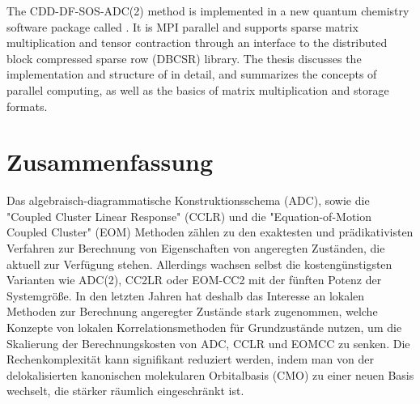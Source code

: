 The CDD-DF-SOS-ADC(2) method is implemented in a new quantum chemistry software package called \mchem{}. It is MPI parallel and supports sparse matrix multiplication and tensor contraction through an interface to the distributed block compressed sparse row (DBCSR) library. The thesis discusses the implementation and structure of \mchem{} in detail, and summarizes the concepts of parallel computing, as well as the basics of matrix multiplication and storage formats.

\nonewpage

\chapter*{Zusammenfassung}

Das algebraisch-diagrammatische Konstruktionsschema (ADC), sowie die "{}Coupled Cluster Linear Response"{} (CCLR) und die "{}Equation-of-Motion Coupled Cluster"{} (EOM) Methoden zählen zu den exaktesten und prädikativisten Verfahren zur Berechnung von Eigenschaften von angeregten Zuständen, die aktuell zur Verfügung stehen. 
Allerdings wachsen selbst die kostengünstigsten Varianten wie ADC(2), CC2LR oder EOM-CC2 mit der fünften Potenz der Systemgrö{\ss}e.
In den letzten Jahren hat deshalb das Interesse an lokalen Methoden zur Berechnung angeregter Zustände stark zugenommen, welche Konzepte von lokalen Korrelationsmethoden für Grundzustände nutzen, um die Skalierung der Berechnungskosten von ADC, CCLR und EOMCC zu senken. 
Die Rechenkomplexität kann signifikant reduziert werden, indem man von der delokalisierten kanonischen molekularen Orbitalbasis (CMO) zu einer neuen Basis wechselt, die stärker räumlich eingeschränkt ist. 
